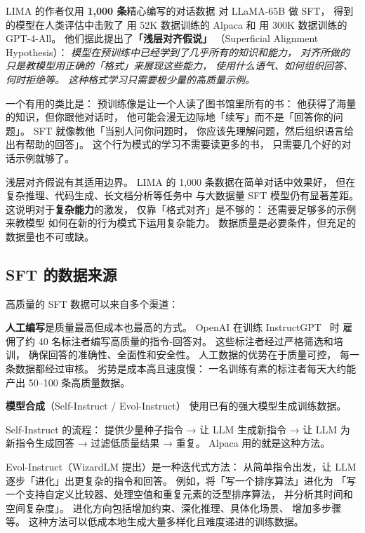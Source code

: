 LIMA 的作者仅用 \textbf{1,000 条}精心编写的对话数据
对 LLaMA-65B 做 SFT，
得到的模型在人类评估中击败了
用 52K 数据训练的 Alpaca 和
用 300K 数据训练的 GPT-4-All。
他们据此提出了\textbf{「浅层对齐假说」}
（Superficial Alignment Hypothesis）：
\emph{模型在预训练中已经学到了几乎所有的知识和能力，
对齐所做的只是教模型用正确的「格式」来展现这些能力，
使用什么语气、如何组织回答、何时拒绝等。
这种格式学习只需要极少量的高质量示例。}

一个有用的类比是：
预训练像是让一个人读了图书馆里所有的书：
他获得了海量的知识，但你跟他对话时，
他可能会漫无边际地「续写」而不是「回答你的问题」。
SFT 就像教他「当别人问你问题时，
你应该先理解问题，然后组织语言给出有帮助的回答」。
这个行为模式的学习不需要读更多的书，
只需要几个好的对话示例就够了。

\begin{warnbox}
浅层对齐假说有其适用边界。
LIMA 的 1,000 条数据在简单对话中效果好，
但在复杂推理、代码生成、长文档分析等任务中
与大数据量 SFT 模型仍有显著差距。
这说明对于\textbf{复杂能力}的激发，
仅靠「格式对齐」是不够的：
还需要足够多的示例来教模型
如何在新的行为模式下运用复杂能力。
数据质量是必要条件，但充足的数据量也不可或缺。
\end{warnbox}

\subsection{SFT 的数据来源}

高质量的 SFT 数据可以来自多个渠道：

\textbf{人工编写}是质量最高但成本也最高的方式。
OpenAI 在训练 InstructGPT~\cite{ouyang2022rlhf} 时
雇佣了约 40 名标注者编写高质量的指令-回答对。
这些标注者经过严格筛选和培训，
确保回答的准确性、全面性和安全性。
人工数据的优势在于质量可控，
每一条数据都经过审核。
劣势是成本高且速度慢：
一名训练有素的标注者每天大约能产出 50--100 条高质量数据。

\textbf{模型合成}（Self-Instruct / Evol-Instruct）
使用已有的强大模型生成训练数据。

Self-Instruct 的流程：
提供少量种子指令 → 让 LLM 生成新指令 →
让 LLM 为新指令生成回答 → 过滤低质量结果 → 重复。
Alpaca 用的就是这种方法。

Evol-Instruct（WizardLM 提出）是一种迭代式方法：
从简单指令出发，让 LLM 逐步「进化」出更复杂的指令和回答。
例如，将「写一个排序算法」进化为
「写一个支持自定义比较器、处理空值和重复元素的泛型排序算法，
并分析其时间和空间复杂度」。
进化方向包括增加约束、深化推理、具体化场景、
增加多步骤等。
这种方法可以低成本地生成大量多样化且难度递进的训练数据。


